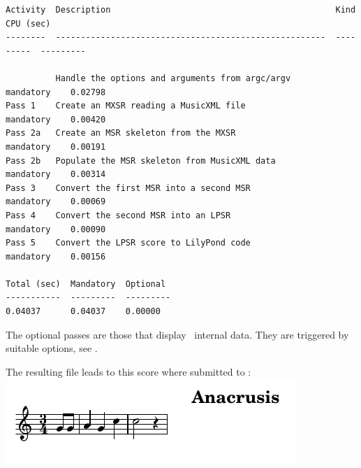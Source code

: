 \begin{lstlisting}[language=Terminal]
Activity  Description                                             Kind       CPU (sec)
--------  ------------------------------------------------------  ---------  ---------

          Handle the options and arguments from argc/argv         mandatory    0.02798
Pass 1    Create an MXSR reading a MusicXML file                  mandatory    0.00420
Pass 2a   Create an MSR skeleton from the MXSR                    mandatory    0.00191
Pass 2b   Populate the MSR skeleton from MusicXML data            mandatory    0.00314
Pass 3    Convert the first MSR into a second MSR                 mandatory    0.00069
Pass 4    Convert the second MSR into an LPSR                     mandatory    0.00090
Pass 5    Convert the LPSR score to LilyPond code                 mandatory    0.00156

Total (sec)  Mandatory  Optional
-----------  ---------  ---------
0.04037      0.04037    0.00000
\end{lstlisting}

The optional passes are those that display \mf\ internal data. They are triggered by suitable options, see .

The resulting  file leads to this score where submitted to \lily:\\
\includegraphics[scale=1]{../graphics/Anacrusis.png}
